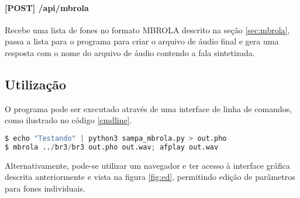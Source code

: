 \paragraph{[POST] /api/mbrola} Recebe uma lista de fones no formato MBROLA
descrito na seção \ref{sec:mbrola}, passa a lista para o programa para criar o
arquivo de áudio final e gera uma resposta com o nome do arquivo de áudio
contendo a fala sintetizada.
\subsection{Utilização}
O programa pode ser executado através de uma interface de linha de comandos,
como ilustrado no código \ref{cmdline}.

\begin{lstlisting}[caption=Utilização por linha de comandos, label=cmdline, language=Python]
$ echo "Testando" | python3 sampa_mbrola.py > out.pho
$ mbrola ../br3/br3 out.pho out.wav; afplay out.wav
\end{lstlisting}

Alternativamente, pode-se utilizar um navegador e ter acesso à interface
gráfica descrita anteriormente e vista na figura \ref{fig:ed}, permitindo edição de parâmetros para fones individuais.


